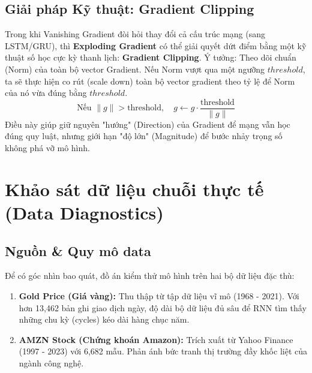 \documentclass[12pt,a4paper]{article}
\begin{document}
\subsection{Giải pháp Kỹ thuật: Gradient Clipping}
Trong khi Vanishing Gradient đòi hỏi thay đổi cả cấu trúc mạng (sang LSTM/GRU), thì \textbf{Exploding Gradient} có thể giải quyết dứt điểm bằng một kỹ thuật số học cực kỳ thanh lịch: \textbf{Gradient Clipping}.
Ý tưởng: Theo dõi chuẩn (Norm) của toàn bộ vector Gradient. Nếu Norm vượt qua một ngưỡng $threshold$, ta sẽ thực hiện co rút (scale down) toàn bộ vector gradient theo tỷ lệ để Norm của nó vừa đúng bằng $threshold$.
\begin{equation}
    \text{Nếu } \|g\| > \text{threshold}, \quad g \leftarrow g \cdot \frac{\text{threshold}}{\|g\|}
\end{equation}
Điều này giúp giữ nguyên "hướng" (Direction) của Gradient để mạng vẫn học đúng quy luật, nhưng giới hạn "độ lớn" (Magnitude) để bước nhảy trọng số không phá vỡ mô hình.


\section{Khảo sát dữ liệu chuỗi thực tế (Data Diagnostics)}

\subsection{Nguồn \& Quy mô data}
Để có góc nhìn bao quát, đồ án kiểm thử mô hình trên hai bộ dữ liệu đặc thù:
\begin{enumerate}
    \item \textbf{Gold Price (Giá vàng):} Thu thập từ tập dữ liệu vĩ mô (1968 - 2021). Với hơn 13,462 bản ghi giao dịch ngày, độ dài bộ dữ liệu đủ sâu để RNN tìm thấy những chu kỳ (cycles) kéo dài hàng chục năm.
    \item \textbf{AMZN Stock (Chứng khoán Amazon):} Trích xuất từ Yahoo Finance (1997 - 2023) với 6,682 mẫu. Phản ánh bức tranh thị trường đầy khốc liệt của ngành công nghệ.
\end{enumerate}
\end{document}
